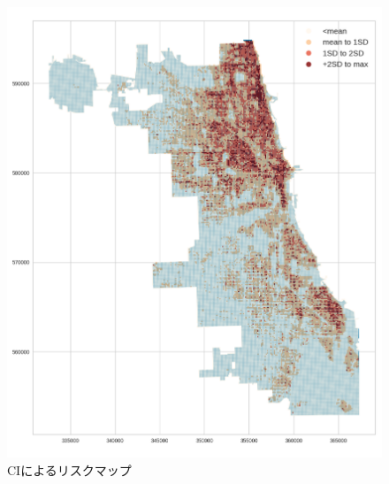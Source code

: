 \begin{figure}[H]
  \centering %
  \includegraphics[scale=0.15]{./figures/CI_riskmap.png}
  \caption{CIによるリスクマップ}
  \label{fig:non-crime-timeseries-ci-risk}
\end{figure}




